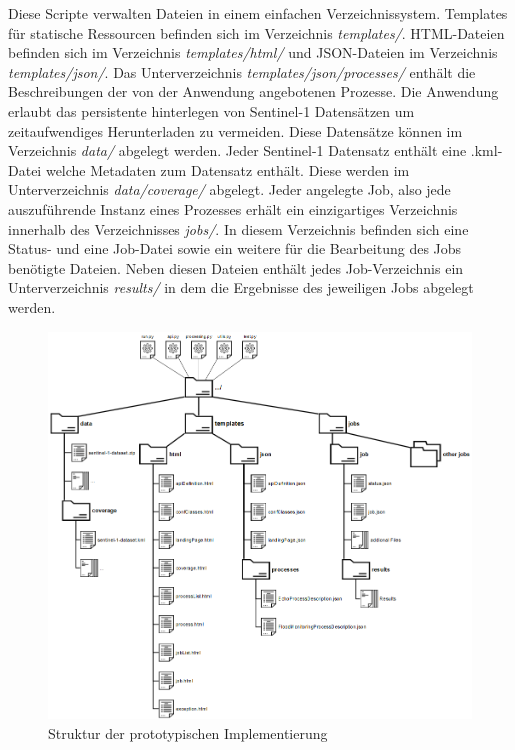 Diese Scripte verwalten Dateien in einem einfachen Verzeichnissystem. Templates für statische Ressourcen befinden sich im Verzeichnis \textit{templates/}. HTML-Dateien 
befinden sich im Verzeichnis \textit{templates/html/} und JSON-Dateien im Verzeichnis \textit{templates/json/}. Das Unterverzeichnis \textit{templates/json/processes/} enthält die 
Beschreibungen der von der Anwendung angebotenen Prozesse. 
Die Anwendung erlaubt das persistente hinterlegen von Sentinel-1 Datensätzen um zeitaufwendiges Herunterladen zu vermeiden. Diese Datensätze können im Verzeichnis \textit{data/} abgelegt werden. Jeder Sentinel-1 Datensatz enthält eine .kml-Datei welche 
Metadaten zum Datensatz enthält. Diese werden im Unterverzeichnis \textit{data/coverage/} abgelegt. 
Jeder angelegte Job, also jede auszuführende Instanz eines Prozesses erhält ein einzigartiges Verzeichnis innerhalb des Verzeichnisses \textit{jobs/}. In diesem 
Verzeichnis befinden sich eine Status- und eine Job-Datei sowie ein weitere für die Bearbeitung des Jobs benötigte Dateien. 
Neben diesen Dateien enthält jedes Job-Verzeichnis ein Unterverzeichnis \textit{results/} in dem die Ergebnisse des jeweiligen Jobs abgelegt werden.

\begin{figure}[H]
    \centering
    \includegraphics[width=\textwidth]{Bilder/folders.png}
    \caption{Struktur der prototypischen Implementierung \cite{structure}}
    \label{structure}
\end{figure}

